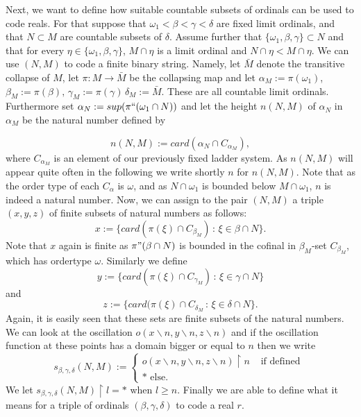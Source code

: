 \documentclass[a4paper,12pt]{article}
\begin{document}
Next, we want to define how suitable countable subsets of ordinals can be used to code reals. 
For that suppose that $\omega_1 < \beta < \gamma < \delta$ are fixed limit ordinals, and that 
$N \subset M$ are countable subsets of $\delta$.
Assume further that $\{ \omega_1, \beta, \gamma\} \subset N$ and that for every 
$\eta \in \{ \omega_1, \beta, \gamma\}$, $M \cap \eta$ is a limit ordinal and $N \cap \eta < M \cap \eta$.
We can use $(N,M)$ to code a finite binary string. Namely, let $\bar{M}$ denote the transitive collapse of 
$M$, let $\pi : M \rightarrow \bar{M}$ be the collapsing map and let 
$\alpha_M := \pi(\omega_1)$, $\beta_M := \pi(\beta), \, \gamma_M := \pi(\gamma) \, \delta_M:= \bar{M}$. 
These are all countable limit ordinals.
Furthermore set $\alpha_N:= sup(\pi``(\omega_1 \cap N))$ and let the height $n(N,M)$ of $\alpha_N$ in $\alpha_M$ 
be the natural number defined by

$$n(N,M):= card (\alpha_N \cap C_{\alpha_M}),$$ where $C_{\alpha_M}$ is an element of our previously fixed ladder system. 
As $n(N,M)$ will appear quite often in the following we write shortly $n$ for $n(N,M)$. Note that
as the order type of each $C_{\alpha}$ is $\omega$, and as $N \cap \omega_1$ is bounded below $M \cap \omega_1$,
$n$ is indeed a natural number.
Now, we can assign to the pair $(N,M)$ a triple $(x,y,z)$ of finite subsets of natural numbers as follows:
$$x:= \{ card(\pi(\xi) \cap C_{\beta_M}) \, : \, \xi \in \beta \cap N \}.$$ Note that $x$ again is finite as $\pi" (\beta \cap N)$ is 
bounded in the cofinal in $\beta_M$-set $C_{\beta_M}$, which has ordertype $\omega$. Similarly we define 
$$y:= \{ card(\pi(\xi) \cap C_{\gamma_M}) \, : \, \xi \in \gamma \cap N \}$$ and
$$z:= \{ card(\pi(\xi) \cap C_{\delta_M} \, : \, \xi \in \delta \cap N \}.$$ Again, it is easily 
seen that these sets are finite subsets of the natural numbers.
We can look at the oscillation $o(x \backslash n, y \backslash n, z \backslash n)$ 
and if the oscillation function at these points has a domain bigger or equal to $n$ then we write
\begin{equation*}
s_{\beta, \gamma, \delta} (N,M):= \begin{cases}
o(x \backslash n, y \backslash n, z \backslash n)\upharpoonright n & \text{ if defined } \\ \ast \text{ else.}
\end{cases}
\end{equation*}
We let $s_{\beta, \gamma, \delta} (N,M) \upharpoonright l = \ast$ when $l \geq n$.
Finally we are able to define what it means for a triple of ordinals $(\beta, \gamma, \delta)$ to code a real $r$.
\end{document}
